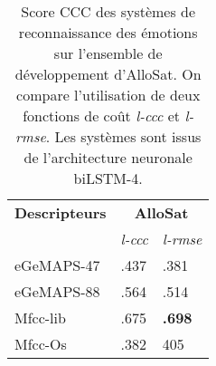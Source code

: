 \begin{table}[htp]
\centering
\begin{tabular}{| l | l l |}
    \hline
    \textbf{Descripteurs} &\multicolumn{2}{c|}{\textbf{AlloSat}} \\
      &\textit{l-ccc}   &\textit{l-rmse}  \\
    \hline
    eGeMAPS-47  &.437 &.381       \\
    eGeMAPS-88  &.564 &.514       \\
    Mfcc-lib    &.675  &\textbf{.698} \\
    Mfcc-Os     &.382   &405      \\
    \hline
\end{tabular}
\caption{Score CCC des systèmes de reconnaissance des émotions sur l'ensemble de développement d'AlloSat. On compare l'utilisation de deux fonctions de coût \textit{l-ccc} et \textit{l-rmse}. Les systèmes sont issus de l'architecture neuronale biLSTM-4.}
\label{tab:cccVSrmse}
\end{table}
